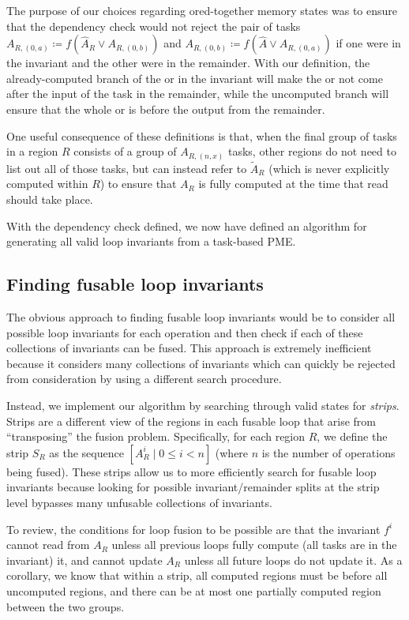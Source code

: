 \documentclass[12pt,letterpaper]{article}
\newcommand*{\opf}{f}
\begin{document}
The purpose of our choices regarding ored-together memory states was to ensure that the dependency check would not reject the pair of tasks $A_{R, (0, a)} \coloneqq f(\hat{A}_R \vee A_{R, (0, b)})$ and $A_{R, (0, b)} \coloneqq f(\hat{A} \vee A_{R, (0, a)})$ if one were in the invariant and the other were in the remainder.
With our definition, the already-computed branch of the or in the invariant will make the or not come after the input of the task in the remainder, while the uncomputed branch will ensure that the whole or is before the output from the remainder.

One useful consequence of these definitions is that, when the final group of tasks in a region $R$ consists of a group of $A_{R, (n, x)}$ tasks, other regions do not need to list out all of those tasks, but can instead refer to $\widetilde{A}_R$ (which is never explicitly computed within $R$) to ensure that $A_R$ is fully computed at the time that read should take place.

With the dependency check defined, we now have defined an algorithm for generating all valid loop invariants from a task-based PME.
\subsection{Finding fusable loop invariants}
The obvious approach to finding fusable loop invariants would be to consider all possible loop invariants for each operation and then check if each of these collections of invariants can be fused.
This approach is extremely inefficient because it considers many collections of invariants which can quickly be rejected from consideration by using a different search procedure.

Instead, we implement our algorithm by searching through valid states for \emph{strips}.
Strips are a different view of the regions in each fusable loop that arise from ``transposing'' the fusion problem.
Specifically, for each region $R$, we define the strip $S_R$ as the sequence $[A_R^i \mid 0 \leq i < n]$ (where $n$ is the number of operations being fused).
These strips allow us to more efficiently search for fusable loop invariants because looking for possible invariant/remainder splits at the strip level bypasses many unfusable collections of invariants.

To review, the conditions for loop fusion to be possible are that the invariant $\opf^i$ cannot read from $A_R$ unless all previous loops fully compute (all tasks are in the invariant) it, and cannot update $A_R$ unless all future loops do not update it.
As a corollary, we know that within a strip, all computed regions must be before all uncomputed regions, and there can be at most one partially computed region between the two groups.
\end{document}
